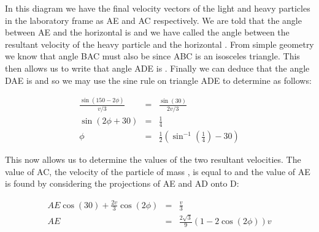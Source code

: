 \begin{problem}
{\begin{enumerate}
In this diagram we have the final velocity vectors of the light and heavy particles in the laboratory frame as AE and AC respectively. We are told that the angle between AE and the horizontal is  and we have called the angle between the resultant velocity of the heavy particle and the horizontal \vari{\phi}. From simple geometry we know that angle BAC must also be \vari{\phi} since ABC is an isosceles triangle. This then allows us to write that angle ADE is \vari{2\phi}. Finally we can deduce that the angle DAE is  and so we may use the sine rule on triangle ADE to determine \vari{\phi} as follows:

\begin{eqnarray*}
\frac{\sin{(150-2\phi)}}{v/3} &=& \frac{\sin{(30)}}{2v/3} \\
\sin{(2\phi+30)} &=& \frac{1}{4} \\
\phi &=& \frac{1}{2}(\sin^{-1}{(\frac{1}{4})}-30)
\end{eqnarray*}

This now allows us to determine the values of the two resultant velocities. The value of AC, the velocity of the particle of mass , is equal to  and the value of AE is found by considering the projections of AE and AD onto D:

\begin{eqnarray*}
AE\cos{(30)}+\frac{2v}{3}\cos{(2\phi)} &=& \frac{v}{3} \\
AE &=& \frac{2\sqrt{3}}{9}(1-2\cos{(2\phi)})v
\end{eqnarray*}


\end{enumerate}
}
\end{problem}